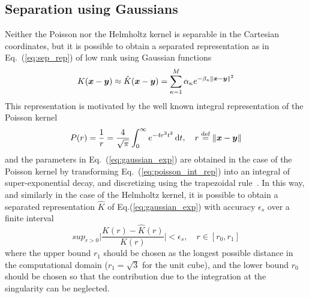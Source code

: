 \subsection{Separation using Gaussians}
Neither the Poisson nor the Helmholtz kernel is separable in the Cartesian coordinates, 
but it is possible to obtain a separated representation as in Eq.~(\ref{eq:sep_rep}) 
of low rank using Gaussian functions
\begin{equation}
    \label{eq:gaussian_exp}
    K(\boldsymbol x-\boldsymbol y) \approx \hat{K}(\boldsymbol x-\boldsymbol y) = 
	\sum_{\kappa=1}^M \alpha_\kappa e^{-\beta_\kappa \|\boldsymbol x-\boldsymbol y\|^2}
\end{equation}
This representation is motivated by the well known integral representation of the 
Poisson kernel\cite{Singer:1960}
\begin{equation}
    \label{eq:poisson_int_rep}
    P(r) = \frac{1}{r} = \frac{4}{\sqrt{\pi}}\int_0^\infty e^{-4r^2t^2}\,\mathrm{d} t, 
	\quad r \stackrel{\text{def}}{\hbox{=}} \|\boldsymbol x-\boldsymbol y\|
\end{equation}
and the parameters in Eq.~(\ref{eq:gaussian_exp}) are obtained in the case of the 
Poisson kernel by transforming Eq.~(\ref{eq:poisson_int_rep}) into an integral of 
super-exponential decay, and discretizing using the trapezoidal 
rule~\cite{Harrison:2003,Frediani:2013p1143}. In this way, 
and similarly in the case of the Helmholtz kernel, it is possible to obtain a separated 
representation $\hat{K}$ of Eq.(\ref{eq:gaussian_exp}) with accuracy $\epsilon_s$ over a 
finite interval
\begin{equation}
    sup_{r>0}\Big|\frac{K(r)-\hat{K}(r)}{K(r)}\Big| < \epsilon_s, \quad r\in[r_0,r_1]
\end{equation}
where the upper bound $r_1$ should be chosen as the longest possible distance
in the computational domain ($r_1=\sqrt{3}$ for the unit cube), and the lower
bound $r_0$ should be chosen so that the contribution due to the integration
at the singularity can be neglected\cite{Frediani:2013p1143}.

